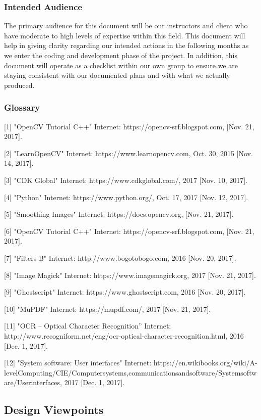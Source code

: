 \documentclass[article, onecolumn, draftclsnofoot,10pt, compsoc]{IEEEtran}
\begin{document}
\subsubsection{Intended Audience}
The primary audience for this document will be our instructors and client who have moderate to high levels of expertise within this field. This document will help in giving clarity regarding our intended actions in the following months as we enter the coding and development phase of the project. In addition, this document will operate as a checklist within our own group to ensure we are staying consistent with our documented plans and with what we actually produced. 

\subsubsection{Glossary}

[1] "OpenCV Tutorial C++" Internet: https://opencv-srf.blogspot.com, [Nov. 21, 2017].

[2] "LearnOpenCV" Internet: https://www.learnopencv.com, Oct. 30, 2015 [Nov. 14, 2017].

[3] "CDK Global" Internet: https://www.cdkglobal.com/, 2017 [Nov. 10, 2017].

[4] "Python" Internet: https://www.python.org/, Oct. 17, 2017 [Nov. 12, 2017].

[5] "Smoothing Images" Internet: https://docs.opencv.org, [Nov. 21, 2017].

[6] "OpenCV Tutorial C++" Internet: https://opencv-srf.blogspot.com, [Nov. 21, 2017].

[7] "Filters B" Internet: http://www.bogotobogo.com, 2016 [Nov. 20, 2017].

[8] "Image Magick" Internet: https://www.imagemagick.org, 2017 [Nov. 21, 2017].

[9] "Ghostscript" Internet: https://www.ghostscript.com, 2016 [Nov. 20, 2017].

[10] "MuPDF" Internet: https://mupdf.com/, 2017 [Nov. 21, 2017].

[11] "OCR – Optical Character Recognition” Internet: http://www.recogniform.net/eng/ocr-optical-character-recognition.html, 2016 [Dec. 1, 2017].

[12] "System software: User interfaces" Internet: https://en.wikibooks.org/wiki/A-levelComputing/CIE/Computersystems,communicationsandsoftware/Systemsoftware/Userinterfaces, 2017 [Dec. 1, 2017].

\subsection{Design Viewpoints}
\end{document}
